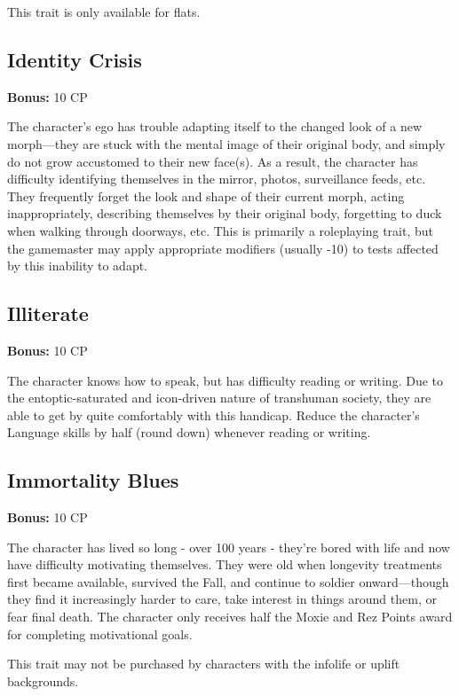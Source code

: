 This trait is only available for flats. 

\subsection{Identity Crisis} \label{sec:traits-identity-crisis} 

\textbf{Bonus:} 10 CP 

The character’s ego has trouble adapting itself to the changed look of a new morph—they are stuck with the mental image of their original body, and simply do not grow accustomed to their new face(s). As a result, the character has difficulty identifying themselves in the mirror, photos, surveillance feeds, etc. They frequently forget the look and shape of their current morph, acting inappropriately, describing themselves by their original body, forgetting to duck when walking through doorways, etc. This is primarily a roleplaying trait, but the gamemaster may apply appropriate modifiers (usually -10) to tests affected by this inability to adapt. 

\subsection{Illiterate} \label{sec:traits-illiterate} 

\textbf{Bonus:} 10 CP 

The character knows how to speak, but has difficulty reading or writing. Due to the entoptic-saturated and icon-driven nature of transhuman society, they are able to get by quite comfortably with this handicap. Reduce the character’s Language skills by half (round down) whenever reading or writing. 

\subsection{Immortality Blues} \label{sec:traits-immortality-blues} 

\textbf{Bonus:} 10 CP 

The character has lived so long - over 100 years - they’re bored with life and now have difficulty motivating themselves. They were old when longevity treatments first became available, survived the Fall, and continue to soldier onward—though they find it increasingly harder to care, take interest in things around them, or fear final death. The character only receives half the Moxie and Rez Points award for completing motivational goals. 

This trait may not be purchased by characters with the infolife or uplift backgrounds. 

